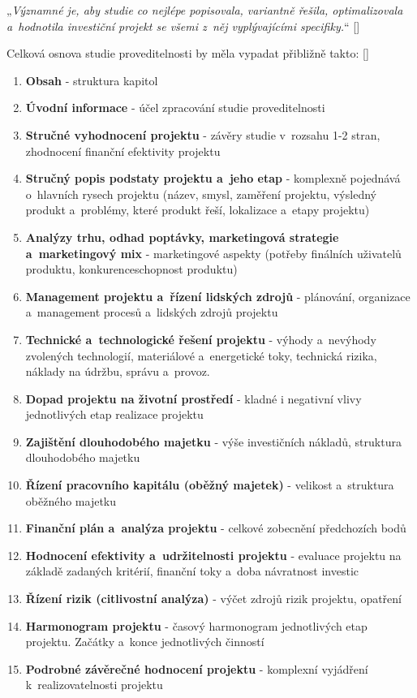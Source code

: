 \documentclass[
	11pt, oneside, printed, final, palatino, monochrome
	microtype,
	table,   %
	lof,     %
	lot     %
]{fithesis3}
\makeatletter
\newcommand{\citepages}[2]{[\cite[#1]{#2}]}
\newcommand{\bold}[1]{\textbf{#1}}
\newcommand{\citace}[1]{„\textit{#1}“} %
\newcommand{\mezera}{\bigskip}
\makeatother
\begin{document}
{\mezera

\citace{Významné je, aby studie co nejlépe popisovala, variantně řešila, optimalizovala a~hodnotila investiční projekt se všemi z~něj vyplývajícími specifiky.} \citepages{8}{Sieber2004} 

\mezera

Celková osnova studie proveditelnosti by měla vypadat přibližně takto: \citepages{8-14}{Sieber2004} 
\mezera
\begin{enumerate}
\item \bold{Obsah} - struktura kapitol
\item \bold{Úvodní informace} - účel zpracování studie proveditelnosti
\item \bold{Stručné vyhodnocení projektu} - závěry studie v~rozsahu 1-2 stran, zhodnocení finanční efektivity projektu
\item \bold{Stručný popis podstaty projektu a~jeho etap} - komplexně pojednává o~hlavních rysech projektu (název, smysl, zaměření projektu, výsledný produkt a~problémy, které produkt řeší, lokalizace a~etapy projektu)
\item \bold{Analýzy trhu, odhad poptávky, marketingová strategie a~marketingový mix} - marketingové aspekty (potřeby finálních uživatelů produktu, konkurenceschopnost produktu)
\item \bold{Management projektu a~řízení lidských zdrojů} - plánování, organizace a~management procesů a~lidských zdrojů projektu 
\item \bold{Technické a~technologické řešení projektu} - výhody a~nevýhody zvolených technologií, materiálové a~energetické toky, technická rizika, náklady na údržbu, správu a~provoz.
\item \bold{Dopad projektu na životní prostředí} - kladné i negativní vlivy jednotlivých etap realizace projektu
\item \bold{Zajištění dlouhodobého majetku} - výše investičních nákladů, struktura dlouhodobého majetku
\item \bold{Řízení pracovního kapitálu (oběžný majetek)} - velikost a~struktura oběžného majetku
\item \bold{Finanční plán a~analýza projektu} - celkové zobecnění předchozích bodů
\item \bold{Hodnocení efektivity a~udržitelnosti projektu} - evaluace projektu na základě zadaných kritérií, finanční toky a~doba návratnost investic
\item \bold{Řízení rizik (citlivostní analýza)} - výčet zdrojů rizik projektu, opatření
\item \bold{Harmonogram projektu} - časový harmonogram jednotlivých etap projektu. Začátky a~konce jednotlivých činností
\item \bold{Podrobné závěrečné hodnocení projektu} - komplexní vyjádření k~realizovatelnosti projektu
\end{enumerate}

}
\end{document}
